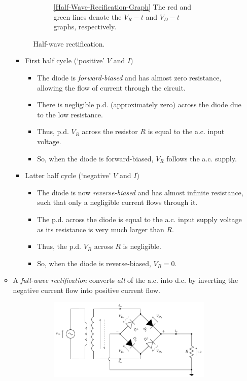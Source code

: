 \documentclass[oneside]{book}
\begin{document}
\begin{itemize}
\begin{itemize}
\begin{figure}[h]
\begin{subfigure}[c]{0.45\textwidth}
                \caption{\ref{Half-Wave-Recification-Graph} The red and green lines denote the \(V_R-t\) and \(V_D-t\) graphs, respectively.}
            \end{subfigure}
            \caption{Half-wave rectification.}
        \end{figure}
        \begin{itemize}
            \item First half cycle (`positive' \(V\) and \(I\))
            \begin{itemize}
                \item The diode is \emph{forward-biased} and has almost zero resistance, allowing the flow of current through the circuit.
                \item There is negligible p.d. (approximately zero) across the diode due to the low resistance.
                \item Thus, p.d. \(V_R\) across the resistor \(R\) is equal to the a.c. input voltage.
                \item So, when the diode is forward-biased, \(V_R\) follows the a.c. supply.
            \end{itemize}
            \item Latter half cycle (`negative' \(V\) and \(I\))
            \begin{itemize}
                \item The diode is now \emph{reverse-biased} and has almost infinite resistance, such that only a negligible current flows through it.
                \item The p.d. across the diode is equal to the a.c. input supply voltage as its resistance is very much larger than \(R\).
                \item Thus, the p.d. \(V_R\) across \(R\) is negligible.
                \item So, when the diode is reverse-biased, \(V_R=0\).
            \end{itemize}
        \end{itemize}
        \item A \emph{full-wave rectification} converts \emph{all} of the a.c. into d.c. by inverting the negative current flow into positive current flow.
        \begin{figure}[h]
            \centering
            \begin{subfigure}[c]{0.45\textwidth}
                \centering
                \includegraphics[width=0.7\linewidth]{../images/Full-Wave-Rectification/Full-Wave-Rectification.pdf}

\end{subfigure}
\end{figure}
\end{itemize}
\end{itemize}
\end{document}
